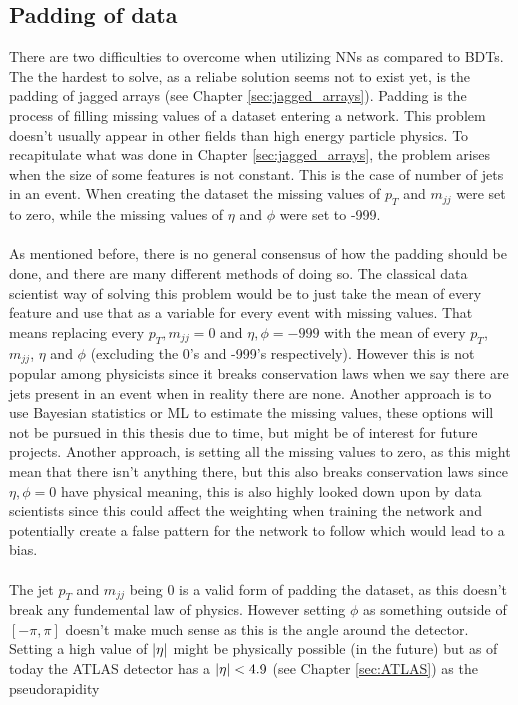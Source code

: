 \documentclass[12pt, a4paper]{book}
\begin{document}
\subsection{Padding of data}\label{sec:padding_NN}
There are two difficulties to overcome when utilizing NNs as compared to BDTs. The the hardest to solve, as a reliabe solution seems not to exist yet, is the padding of jagged arrays (see Chapter \ref{sec:jagged_arrays}).
Padding is the process of filling missing values of a dataset entering a network. This problem doesn't usually appear in other fields than high energy particle physics. To recapitulate what was done in Chapter \ref{sec:jagged_arrays}, the problem arises when the size 
of some features is not constant. This is the case of number of jets in an event. When creating the dataset the missing values of $p_T$ and $m_{jj}$ were set to zero, while the missing values of $\eta$ and $\phi$ were set to -999.\\
\\As mentioned before, there is no general consensus of how the padding should be done, and there are many different methods of doing so. The classical data scientist way of solving this problem would be to just take 
the mean of every feature and use that as a variable for every event with missing values. That means replacing every $p_T, m_{jj} = 0$ and $\eta,\phi=-999$ with the mean of every $p_T$, $m_{jj}$, $\eta$ and $\phi$ (excluding the 0's and -999's respectively). 
However this is not popular among physicists since it breaks conservation laws when we say there are jets present in an event when in reality there are none. Another approach is to use Bayesian statistics or ML to estimate the missing values, 
these options will not be pursued in this thesis due to time, but might be of interest for future projects. Another approach, is setting all the missing values to zero, as this might mean that there isn't anything there, 
but this also breaks conservation laws since $\eta,\phi=0$ have physical meaning, this is also highly looked down upon by data scientists since this could affect the weighting when training the network and potentially create a false pattern for the network to follow which would lead to a bias.\\ 
\\The jet $p_T$ and $m_{jj}$ being 0 is a valid form of padding the dataset, as this doesn't break any fundemental law of physics. However setting $\phi$ as something outside of $[-\pi,\pi]$ doesn't make much sense 
as this is the angle around the detector. Setting a high value of $\abs{\eta}$ might be physically possible (in the future) but as of today the ATLAS detector has a $\abs{\eta}<4.9$ (see Chapter \ref{sec:ATLAS}) as the pseudorapidity 
\end{document}
